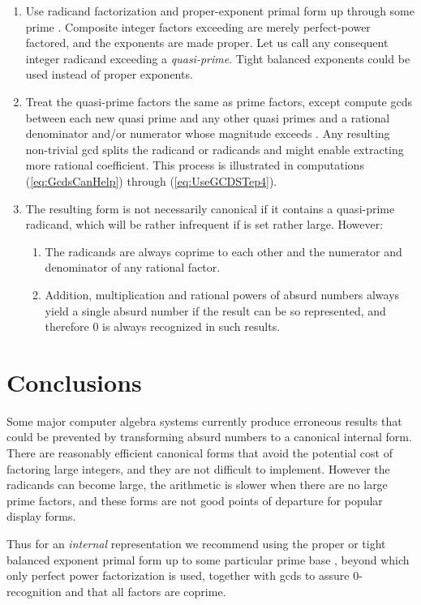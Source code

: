 \documentclass[12pt,english]{article}
\theoremstyle{definition}
\theoremstyle{remark}
\theoremstyle{plain}
\theoremstyle{plain}
\begin{document}
\begin{enumerate}
\item Use radicand factorization and proper-exponent primal form up through
some prime . Composite integer factors exceeding 
are merely perfect-power factored, and the exponents are made proper.
Let us call any consequent integer radicand exceeding 
a \textsl{quasi-prime}. Tight balanced exponents could be used instead
of proper exponents.
\item Treat the quasi-prime factors the same as prime factors, except compute
gcds between each new quasi prime and any other quasi primes and a
rational denominator and/or numerator whose magnitude exceeds .
Any resulting non-trivial gcd splits the radicand or radicands and
might enable extracting more rational coefficient. This process is
illustrated in computations (\ref{eq:GcdsCanHelp}) through (\ref{eq:UseGCDSTep4}).
\item The resulting form is not necessarily canonical if it contains a quasi-prime
radicand, which will be rather infrequent if  is set rather
large. However:

\begin{enumerate}
\item The radicands are always coprime to each other and the numerator and
denominator of any rational factor.
\item Addition, multiplication and rational powers of absurd numbers always
yield a single absurd number if the result can be so represented,
and therefore 0 is always recognized in such results.
\end{enumerate}
\end{enumerate}

\section{Conclusions\label{sec:Conclusion}}

Some major computer algebra systems currently produce erroneous results
that could be prevented by transforming absurd numbers to a canonical
internal form. There are reasonably efficient canonical forms that
avoid the potential cost of factoring large integers, and they are
not difficult to implement. However the radicands can become large,
the arithmetic is slower when there are no large prime factors, and
these forms are not good points of departure for popular display forms.

Thus for an \textsl{internal} representation we recommend using the
proper or tight balanced exponent primal form up to some particular
prime base , beyond which only perfect power factorization
is used, together with gcds to assure 0-recognition and that all factors
are coprime.
\end{document}
